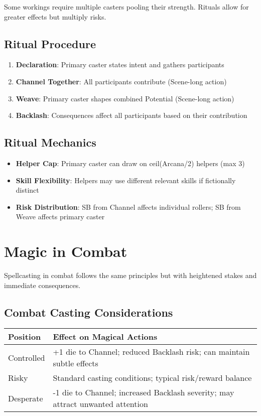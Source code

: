 Some workings require multiple casters pooling their strength. Rituals allow for greater effects but multiply risks.

\subsection*{Ritual Procedure}

\begin{enumerate}
    \item \textbf{Declaration}: Primary caster states intent and gathers participants
    \item \textbf{Channel Together}: All participants contribute (Scene-long action)
    \item \textbf{Weave}: Primary caster shapes combined Potential (Scene-long action)  
    \item \textbf{Backlash}: Consequences affect all participants based on their contribution
\end{enumerate}

\subsection*{Ritual Mechanics}

\begin{itemize}
    \item \textbf{Helper Cap}: Primary caster can draw on ceil(Arcana/2) helpers (max 3)
    \item \textbf{Skill Flexibility}: Helpers may use different relevant skills if fictionally distinct
    \item \textbf{Risk Distribution}: SB from Channel affects individual rollers; SB from Weave affects primary caster
\end{itemize}

\section*{Magic in Combat}

Spellcasting in combat follows the same principles but with heightened stakes and immediate consequences.

\subsection*{Combat Casting Considerations}

\begin{fatebox}
\begin{tabularx}{\textwidth}{lX}
\toprule
\textbf{Position} & \textbf{Effect on Magical Actions} \\
\midrule
Controlled & +1 die to Channel; reduced Backlash risk; can maintain subtle effects \\
Risky & Standard casting conditions; typical risk/reward balance \\
Desperate & -1 die to Channel; increased Backlash severity; may attract unwanted attention \\
\bottomrule
\end{tabularx}
\end{fatebox}

